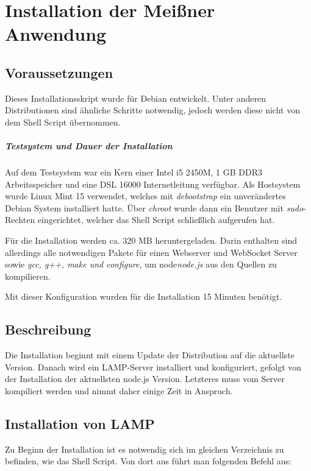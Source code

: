 \chapter{Installation der Meißner Anwendung}
\section{Voraussetzungen}
Dieses Installationsskript wurde für Debian entwickelt. Unter anderen Distributionen sind ähnliche Schritte notwendig, jedoch werden diese nicht von dem Shell Script übernommen.

\paragraph{Testsystem und Dauer der Installation}
Auf dem Testsystem war ein Kern einer Intel i5 2450M, 1 GB DDR3 Arbeitsspeicher und eine DSL 16000 Internetleitung verfügbar. Als Hostsystem wurde Linux Mint 15 verwendet, welches mit \emph{debootstrap} ein unverändertes Debian System installiert hatte. Über \emph{chroot} wurde dann ein Benutzer mit \emph{sudo}-Rechten eingerichtet, welcher das Shell Script schließlich aufgerufen hat.\par 

Für die Installation werden ca. 320 MB heruntergeladen. Darin enthalten sind allerdings alle notwendigen Pakete für einen Webserver und WebSocket Server sowie \emph{gcc, g++, make und configure}, um node\emph{node.js} aus den Quellen zu kompilieren.\par

Mit dieser Konfiguration wurden für die Installation 15 Minuten benötigt.

\section{Beschreibung}
Die Installation beginnt mit einem Update der Distribution auf die aktuellste Version. Danach wird ein LAMP-Server installiert und konfiguriert, gefolgt von der Installation der aktuellsten node.js Version. Letzteres muss vom Server kompiliert werden und nimmt daher einige Zeit in Anspruch.

\section{Installation von LAMP}
Zu Beginn der Installation ist es notwendig sich im gleichen Verzeichnis zu befinden, wie das Shell Script. Von dort aus führt man folgenden Befehl aus:

